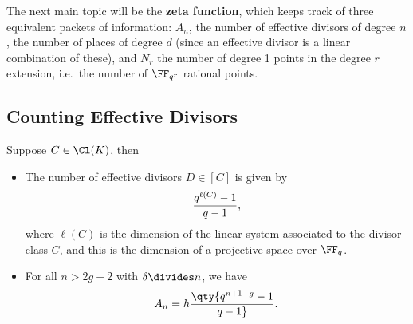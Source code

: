 The next main topic will be the \textbf{zeta function}, which keeps
track of three equivalent packets of information: \(A_n\), the number of
effective divisors of degree \(n\), the number of places of degree \(d\)
(since an effective divisor is a linear combination of these), and
\(N_r\) the number of degree 1 points in the degree \(r\) extension,
i.e.~the number of \(\FF_{q^r}\) rational points.

\hypertarget{counting-effective-divisors}{%
\subsection{Counting Effective
Divisors}\label{counting-effective-divisors}}

\begin{lemma}[?]

Suppose \(C\in \Cl(K)\), then

\begin{itemize}
\item
  The number of effective divisors \(D \in [C]\) is given by
  \begin{align*}  
  {q^{\ell(C)} -1 \over q-1} 
  ,\end{align*} where \(\ell(C)\) is the dimension of the linear system
  associated to the divisor class \(C\), and this is the dimension of a
  projective space over \(\FF_q\).
\item
  For all \(n>2g-2\) with \(\delta \divides n\), we have
  \begin{align*}  
  A_n = h \qty{ q^{n+1-g} - 1\over q-1}
  .\end{align*}
\end{itemize}

\end{lemma}


